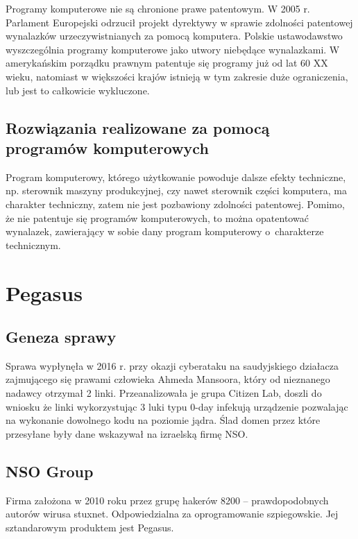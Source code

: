 \documentclass{article}
\begin{document}
Programy komputerowe nie są chronione prawe patentowym. W 2005 r. Parlament Europejski odrzucił projekt dyrektywy w sprawie zdolności patentowej wynalazków urzeczywistnianych za pomocą komputera.
Polskie ustawodawstwo wyszczególnia programy komputerowe jako utwory niebędące wynalazkami.
W amerykańskim porządku prawnym patentuje się programy już od lat 60 XX wieku, natomiast w większości krajów istnieją w tym zakresie duże ograniczenia, lub jest to całkowicie wykluczone.

\subsection{Rozwiązania realizowane za pomocą programów komputerowych}

Program komputerowy, którego użytkowanie powoduje dalsze efekty techniczne, np. sterownik maszyny produkcyjnej, czy nawet sterownik części komputera, ma charakter techniczny, zatem nie jest pozbawiony zdolności patentowej. Pomimo, że nie patentuje się programów komputerowych, to można opatentować wynalazek, zawierający w sobie dany program komputerowy o~charakterze technicznym.

\newpage

\section{Pegasus}

\subsection{Geneza sprawy}

Sprawa wypłynęła w 2016 r. przy okazji cyberataku na saudyjskiego działacza zajmującego się prawami człowieka Ahmeda Mansoora, który od nieznanego nadawcy otrzymał 2 linki. Przeanalizowała je grupa Citizen Lab, doszli do wniosku że linki wykorzystując 3 luki typu 0-day infekują urządzenie pozwalając na wykonanie dowolnego kodu na poziomie jądra. Ślad domen przez które przesyłane były dane wskazywał na izraelską firmę NSO.

\subsection{NSO Group}

Firma założona w 2010 roku przez grupę hakerów 8200 -- prawdopodobnych autorów wirusa stuxnet. Odpowiedzialna za oprogramowanie szpiegowskie. Jej sztandarowym produktem jest Pegasus.
\end{document}
